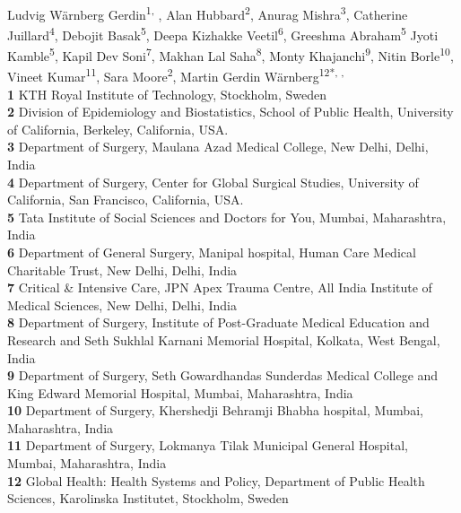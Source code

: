 \documentclass[10pt,letterpaper]{article}\usepackage[]{graphicx}\usepackage[]{color}
\date{}
\begin{document}
\vspace*{0.2in}

\begin{flushleft}
{\Large
\textbf{} %
}
\newline
\\
Ludvig Wärnberg Gerdin\textsuperscript{1, \Yinyang},
Alan Hubbard\textsuperscript{2}, 
Anurag Mishra\textsuperscript{3}, 
Catherine Juillard\textsuperscript{4}, 
Debojit Basak\textsuperscript{5}, 
Deepa Kizhakke Veetil\textsuperscript{6}, 
Greeshma Abraham\textsuperscript{5}
Jyoti Kamble\textsuperscript{5},
Kapil Dev Soni\textsuperscript{7}, 
Makhan Lal Saha\textsuperscript{8}, 
Monty Khajanchi\textsuperscript{9}, 
Nitin Borle\textsuperscript{10},
Vineet Kumar\textsuperscript{11}, 
Sara Moore\textsuperscript{2}, 
Martin Gerdin Wärnberg\textsuperscript{12*\textcurrency, \Yinyang, \ddag}
\\
\bigskip
\textbf{1} KTH Royal Institute of Technology, Stockholm, Sweden
\\
\textbf{2} Division of Epidemiology and Biostatistics, School of Public Health, University of California, Berkeley, California, USA.
\\
\textbf{3} Department of Surgery, Maulana Azad Medical College, New Delhi, Delhi, India
\\
\textbf{4} Department of Surgery, Center for Global Surgical Studies, University of California, San Francisco, California, USA.
\\
\textbf{5} Tata Institute of Social Sciences and Doctors for You, Mumbai, Maharashtra, India
\\
\textbf{6} Department of General Surgery, Manipal hospital, Human Care Medical Charitable Trust, New Delhi, Delhi, India
\\
\textbf{7} Critical \& Intensive Care, JPN Apex Trauma Centre, All India Institute of Medical Sciences, New Delhi, Delhi, India
\\
\textbf{8} Department of Surgery, Institute of Post-Graduate Medical Education and Research and Seth Sukhlal Karnani Memorial Hospital, Kolkata, West Bengal, India
\\
\textbf{9} Department of Surgery, Seth Gowardhandas Sunderdas Medical College and King Edward Memorial Hospital, Mumbai, Maharashtra, India
\\
\textbf{10} Department of Surgery, Khershedji Behramji Bhabha hospital, Mumbai, Maharashtra, India
\\
\textbf{11} Department of Surgery, Lokmanya Tilak Municipal General Hospital, Mumbai, Maharashtra, India
\\
\textbf{12} Global Health: Health Systems and Policy, Department of Public Health Sciences, Karolinska Institutet, Stockholm, Sweden
\bigskip


\end{flushleft}
\end{document}
